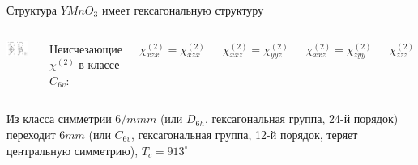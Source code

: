 \documentclass[9pt, compress, xcolor=table]{beamer}
\begin{document}
\begin{frame}{Структура}
$Y Mn O_3$ имеет гексагональную структуру
\begin{columns}
\column{10cm}
\begin{center}
\includegraphics[width=0.8\textwidth]{shg11}
\end{center}
\column{2.5cm}
\centering
\textcolor{blue!50!black}{Неисчезающие $\chi^{(2)}$ в классе $C_{6v}$}:


$\chi^{(2)}_{xzx}=\chi^{(2)}_{xzx}$

$\chi^{(2)}_{xxz}=\chi^{(2)}_{yyz}$

$\chi^{(2)}_{xxz}=\chi^{(2)}_{zyy}$

$\chi^{(2)}_{zzz}$

\end{columns}
Из класса симметрии $6/mmm$ (или $D_{6h}$, гексагональная группа, 24-й порядок) переходит $6mm$ (или $C_{6v}$, гексагональная группа, 12-й порядок, теряет центральную симметрию), $T_c=913^{\circ}$

\end{frame}
\end{document}
